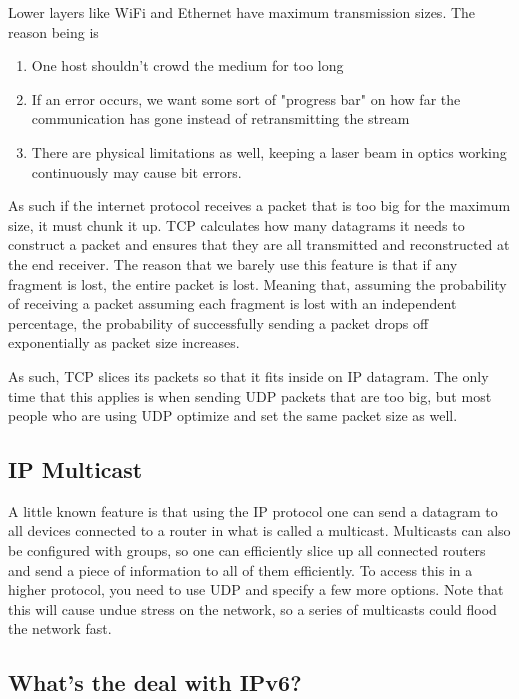 Lower layers like WiFi and Ethernet have maximum transmission sizes.
The reason being is

\begin{enumerate}
  \item One host shouldn't crowd the medium for too long
  \item If an error occurs, we want some sort of "progress bar" on how far the communication has gone instead of retransmitting the stream
  \item There are physical limitations as well, keeping a laser beam in optics working continuously may cause bit errors.
\end{enumerate}

As such if the internet protocol receives a packet that is too big for the maximum size, it must chunk it up.
TCP calculates how many datagrams it needs to construct a packet and ensures that they are all transmitted and reconstructed at the end receiver.
The reason that we barely use this feature is that if any fragment is lost, the entire packet is lost.
Meaning that, assuming the probability of receiving a packet assuming each fragment is lost with an independent percentage, the probability of successfully sending a packet drops off exponentially as packet size increases.

As such, TCP slices its packets so that it fits inside on IP datagram.
The only time that this applies is when sending UDP packets that are too big, but most people who are using UDP optimize and set the same packet size as well.

\subsection{IP Multicast}

A little known feature is that using the IP protocol one can send a datagram to all devices connected to a router in what is called a multicast.
Multicasts can also be configured with groups, so one can efficiently slice up all connected routers and send a piece of information to all of them efficiently.
To access this in a higher protocol, you need to use UDP and specify a few more options.
Note that this will cause undue stress on the network, so a series of multicasts could flood the network fast.

\subsection{What's the deal with IPv6?}

